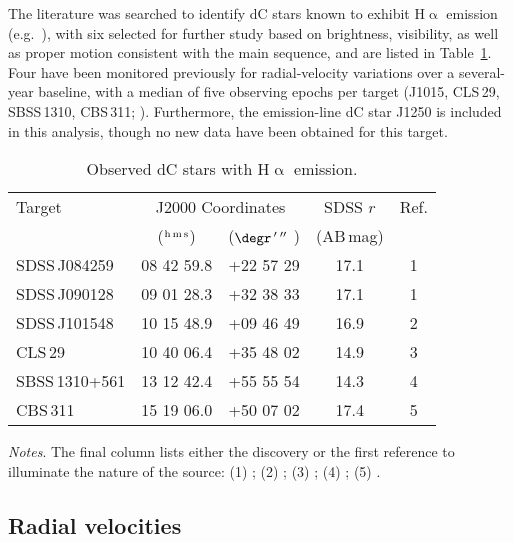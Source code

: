 \documentclass[fleqn,usenatbib,useAMS]{mnras}
\begin{document}
The literature was searched to identify dC stars known to exhibit H$\upalpha$ emission (e.g.\ \citealt{Lowrance03,Green2013}), with six selected for further study based on brightness, visibility, as well as proper motion consistent with the main sequence, and are listed in Table~\ref{tab:Targets}.  Four have been monitored previously for radial-velocity variations over a several-year baseline, with a median of five observing epochs per target (J1015, CLS\,29, SBSS\,1310, CBS\,311; \citealt{Whitehouse18}).  Furthermore, the emission-line dC star J1250 is included in this analysis, though no new data have been obtained for this target.



\begin{table}
\centering
\caption{Observed dC stars with H$\upalpha$ emission.}
\label{tab:Targets}
\begin{tabular}{lcccc}

\hline

Target 			&\multicolumn{2}{c}{J2000 Coordinates}	&SDSS $r$	&Ref.\\
	 			&($^{\rm h\,m\,s}$)	&($\degr\,'\,''$ ) 		&(AB\,mag)	&\\
\hline

SDSS\,J084259 	&08 42 59.8 		&+22 57 29 		&17.1		&1\\
SDSS\,J090128 	&09 01 28.3 		&+32 38 33 		&17.1		&1\\
SDSS\,J101548 	&10 15 48.9 		&+09 46 49 		&16.9		&2\\
CLS\,29  			&10 40 06.4  		&+35 48 02 		&14.9  		&3\\
SBSS\,1310+561 	&13 12 42.4 		&+55 55 54 		&14.3		&4\\
CBS\,311 			&15 19 06.0 		&+50 07 02 		&17.4		&5\\

\hline

\end{tabular}
\flushleft
{\em Notes}.  The final column lists either the discovery or the first reference to illuminate the nature of the source: (1) \citealt{Green2013}; (2) \citealt{Whitehouse18}; (3) \citealt{Mould85}; (4) \citealt{Rossi2011}; (5) \citealt{Liebert1994}.  
\end{table}

\subsection{Radial velocities}
\end{document}
